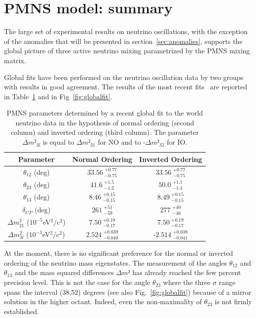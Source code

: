 \section{ PMNS model: summary}
\label{sec:summary}


The large set of experimental results on neutrino oscillations, with the exception of the anomalies that will be presented in section~\ref{sec:anomalies}, supports the global picture of three active neutrino mixing parametrized by the PMNS mixing matrix.

Global fits have been performed on the neutrino oscillation data by two groups~\cite{nufit,Capozzi:2016rtj} with results in good agreement.
The results of the most recent fits~\cite{nufit} are reported in Table~\ref{tab:globalfit} and in Fig~\ref{fig:globalfit}.

\begin{table}[htbp]
\centering
\begin{tabular}{|c|c|c|}
  \hline
  Parameter & Normal Ordering & Inverted Ordering  \\ 
  \hline
$\theta_{12}$ (deg)& $33.56\:^{+0.77}_{-0.75}$ &  $33.56\:^{+0.77}_{-0.75}$\\  
  $\theta_{23}$ (deg)& $41.6\:^{+1.5}_{-1.2}$ &  $50.0\:^{+1.1}_{-1.4}$\\  
  $\theta_{13}$ (deg)& $8.46\:^{+0.15}_{-0.15}$ & $8.49\:^{+0.15}_{-0.15}$ \\  
  $\delta_{CP}$ (deg)&  $261\:^{+51}_{-59}$& $277\:^{+40}_{-46}$ \\  
  $\Delta m^2_{21}$ ($10^{-5}$eV$^2$/c$^2$)& $7.50\:^{+0.19}_{-0.17}$ & $7.50\:^{+0.19}_{-0.17}$ \\  
  $\Delta m^2_{3l}$ ($10^{-3}$eV$^2$/c$^2$)&  $2.524\:^{+0.039}_{-0.040}$&  -$2.514\:^{+0.038}_{-0.041}$\\  
  \hline
\end{tabular}
\caption{
PMNS parameters determined by a recent global fit to the world neutrino data \cite{nufit} in the hypothesis of normal ordering (second column) and inverted ordering (third column). The parameter $\Delta m²_{3l}$ is equal to $\Delta m²_{31}$ for NO and to -$\Delta m²_{32}$ for IO. }
\label{tab:globalfit}
\end{table}


At the moment, there is no significant preference for the normal or inverted ordering of the neutrino mass eigenstates. The measurement of the angles $\theta_{12}$ and 
$\theta_{13}$ and the mass squared differences $\Delta m² $ has already reached the few percent precision level. This is not the case for the angle $\theta_{23}$ where the three $\sigma$ range spans the interval (38,52) degrees (see also Fig.~\ref{fig:globalfit}) because of a mirror solution in the higher octant. Indeed, even the non-maximality of $\theta_{23}$ is not firmly established. 

